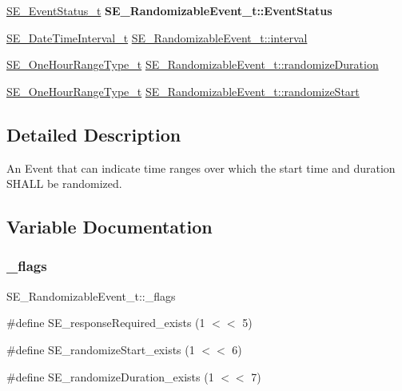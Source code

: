 \begin{DoxyCompactItemize}
\hyperlink{structSE__EventStatus__t}{S\+E\+\_\+\+Event\+Status\+\_\+t} {\bfseries S\+E\+\_\+\+Randomizable\+Event\+\_\+t\+::\+Event\+Status}
\item 
\hyperlink{structSE__DateTimeInterval__t}{S\+E\+\_\+\+Date\+Time\+Interval\+\_\+t} \hyperlink{group__RandomizableEvent_gae999a6ae1f1d2329c6432ed09f24f327}{S\+E\+\_\+\+Randomizable\+Event\+\_\+t\+::interval}
\item 
\hyperlink{group__OneHourRangeType_ga2b9c57435b20a5fc0689922b77e97c2d}{S\+E\+\_\+\+One\+Hour\+Range\+Type\+\_\+t} \hyperlink{group__RandomizableEvent_ga6e6106d5c42ed5e0148e74fec7ff7e40}{S\+E\+\_\+\+Randomizable\+Event\+\_\+t\+::randomize\+Duration}
\item 
\hyperlink{group__OneHourRangeType_ga2b9c57435b20a5fc0689922b77e97c2d}{S\+E\+\_\+\+One\+Hour\+Range\+Type\+\_\+t} \hyperlink{group__RandomizableEvent_ga57f58e1327bdf7b248fd53ce7590c13d}{S\+E\+\_\+\+Randomizable\+Event\+\_\+t\+::randomize\+Start}
\end{DoxyCompactItemize}


\subsection{Detailed Description}
An Event that can indicate time ranges over which the start time and duration S\+H\+A\+LL be randomized. 

\subsection{Variable Documentation}
\mbox{\label{group__RandomizableEvent_ga44a38708b02c27229ecb4d5e2b7c03d3}} 
\subsubsection{\texorpdfstring{\+\_\+flags}{\_flags}}
{\footnotesize\ttfamily S\+E\+\_\+\+Randomizable\+Event\+\_\+t\+::\+\_\+flags}

\#define S\+E\+\_\+response\+Required\+\_\+exists (1 $<$$<$ 5)

\#define S\+E\+\_\+randomize\+Start\+\_\+exists (1 $<$$<$ 6)

\#define S\+E\+\_\+randomize\+Duration\+\_\+exists (1 $<$$<$ 7) \mbox{\label{group__RandomizableEvent_gadf7708c10d4b88cd791c61a0fcd5975b}} 
